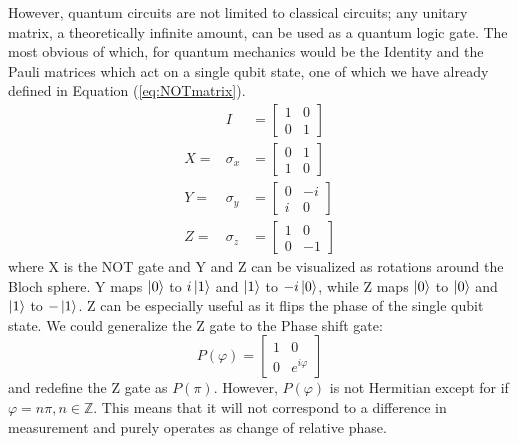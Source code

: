 \documentclass[reqno]{amsart}
\numberwithin{equation}{section}
\numberwithin{figure}{section}
\begin{document}
\begin{justify}
However, quantum circuits are not limited to classical circuits; any unitary matrix, a theoretically infinite amount, \cite{Barenco1995} can be used as a quantum logic gate. The most obvious of which, for quantum mechanics would be the Identity and the Pauli matrices \cite{Pauli1925} which act on a single qubit state, one of which we have already defined in Equation (\ref{eq:NOTmatrix}).
    \begin{eqnarray}
        &I& = \begin{bmatrix}
                1 & 0 \\
                0 & 1
                \end{bmatrix} \\
        X = &\sigma_{x}& = \begin{bmatrix}
                            0 & 1 \\
                            1 & 0
                            \end{bmatrix} \\
        Y = &\sigma_{y}& = \begin{bmatrix}
                            0 & -i \\
                            i & 0
                            \end{bmatrix} \\
        Z = &\sigma_{z}& = \begin{bmatrix}
                            1 & 0 \\
                            0 & -1
                            \end{bmatrix}
    \end{eqnarray}
where X is the NOT gate and Y and Z can be visualized as rotations around the Bloch sphere. Y maps $\ket{0}$ to $i\ket{1}$ and $\ket{1}$ to $-i\ket{0}$, while Z maps $\ket{0}$ to $\ket{0}$ and $\ket{1}$ to $-\ket{1}$. Z can be especially useful as it flips the phase of the single qubit state. We could generalize the Z gate to the Phase shift gate:
    \begin{equation}
        P(\varphi) = \begin{bmatrix}
                    1 & 0 \\
                    0 & e^{i\varphi}
                    \end{bmatrix}
    \end{equation}
and redefine the Z gate as $P(\pi)$. However, $P(\varphi)$ is not Hermitian except for if $\varphi = n\pi, n \in \mathbb{Z}$. This means that it will not correspond to a difference in measurement and purely operates as change of relative phase. \\


\end{justify}
\end{document}
